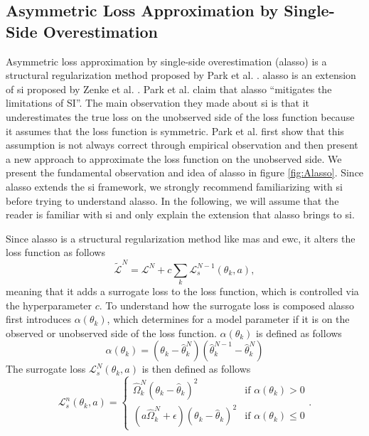 \subsection{Asymmetric Loss Approximation by Single-Side Overestimation}
\label{sec:Related_work:Continual_Learning:ALASSO}
Asymmetric loss approximation by single-side overestimation (\gls{alasso}) is a structural regularization method proposed by Park et al. \cite{park2019continual}.
\gls{alasso} is an extension of \gls{si} proposed by Zenke et al. \cite{zenke2017continual}. Park et al. claim that \gls{alasso} \enquote{mitigates the limitations of SI}.
The main observation they made about \gls{si} is that it underestimates the true loss on the unobserved side of the loss
function because it assumes that the loss function is symmetric. Park et al. first show that this assumption is not always correct through empirical observation
and then present a new approach to approximate the loss function on the unobserved side. We present the fundamental observation and idea of \gls{alasso} in figure
\ref{fig:Alasso}. Since \gls{alasso} extends the \gls{si} framework, we strongly recommend familiarizing with \gls{si} before
trying to understand \gls{alasso}. In the following, we will assume that the reader is familiar with \gls{si} and only explain the extension that \gls{alasso}
brings to \gls{si}. \par
Since \gls{alasso} is a structural regularization method like \gls{mas} and \gls{ewc}, it alters the loss function as follows
\begin{equation}
    \tilde{\mathcal{L}}^N = \mathcal{L}^N + c \sum_k \mathcal{L}_s^{N-1}(\theta_k,a),
\end{equation}
meaning that it adds a surrogate loss to the loss function, which is controlled via the hyperparameter $c$. To understand how the surrogate loss is composed
\gls{alasso} first introduces $\alpha(\theta_k)$, which determines for a model parameter if it is on the observed or unobserved side of the loss function.
$\alpha(\theta_k)$ is defined as follows
\begin{equation}
    \alpha(\theta_k) = (\theta_k - \hat{\theta}^N_k) (\hat{\theta}^{N-1}_k - \hat{\theta}^N_k)
\end{equation}
The surrogate loss $\mathcal{L}^N_s(\theta_k,a)$ is then defined as follows
\begin{equation}
    \mathcal{L}_s^n(\theta_k,a) = \begin{cases} \hat{\Omega}^N_k (\theta_k - \hat{\theta}_k)^2 & \text{if } \alpha(\theta_k) > 0 \\
    (a \hat{\Omega}^N_k + \epsilon)(\theta_k - \hat{\theta}_k)^2 & \text{if } \alpha(\theta_k) \leq 0 \end{cases}.
\end{equation}
